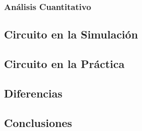 \subsubsection{Análisis Cuantitativo}



\subsection{Circuito en la Simulación}

\subsection{Circuito en la Práctica}

\subsection{Diferencias}

\subsection{Conclusiones}

